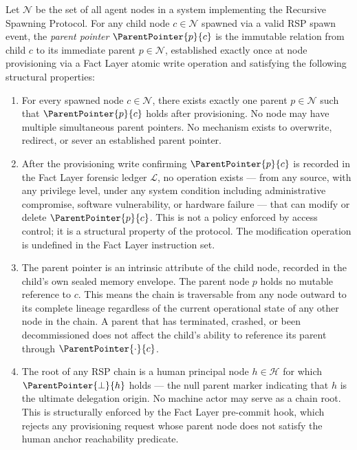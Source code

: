 \begin{dfn}\label{dfn:parent-pointer}
Let $\mathcal{N}$ be the set of all agent nodes in a \bxthree{} system implementing the Recursive Spawning Protocol. For any child node $c \in \mathcal{N}$ spawned via a valid RSP spawn event, the \emph{parent pointer} $\ParentPointer{p}{c}$ is the immutable relation from child $c$ to its immediate parent $p \in \mathcal{N}$, established exactly once at node provisioning via a Fact Layer atomic write operation and satisfying the following structural properties:

\begin{enumerate}
    \item[(P1) \textbf{Uniqueness}] For every spawned node $c \in \mathcal{N}$, there exists exactly one parent $p \in \mathcal{N}$ such that $\ParentPointer{p}{c}$ holds after provisioning. No node may have multiple simultaneous parent pointers. No mechanism exists to overwrite, redirect, or sever an established parent pointer.

    \item[(P2) \textbf{Immutability}] After the provisioning write confirming $\ParentPointer{p}{c}$ is recorded in the Fact Layer forensic ledger $\mathcal{L}$, no operation exists — from any source, with any privilege level, under any system condition including administrative compromise, software vulnerability, or hardware failure — that can modify or delete $\ParentPointer{p}{c}$. This is not a policy enforced by access control; it is a structural property of the protocol. The modification operation is undefined in the Fact Layer instruction set.

    \item[(P3) \textbf{Directionality}] The parent pointer is an intrinsic attribute of the child node, recorded in the child's own sealed memory envelope. The parent node $p$ holds no mutable reference to $c$. This means the chain is traversable from any node outward to its complete lineage regardless of the current operational state of any other node in the chain. A parent that has terminated, crashed, or been decommissioned does not affect the child's ability to reference its parent through $\ParentPointer{\cdot}{c}$.

    \item[(P4) \textbf{Human Anchor Termination}] The root of any RSP chain is a human principal node $h \in \mathcal{H}$ for which $\ParentPointer{\bot}{h}$ holds — the null parent marker indicating that $h$ is the ultimate delegation origin. No machine actor may serve as a chain root. This is structurally enforced by the Fact Layer pre-commit hook, which rejects any provisioning request whose parent node does not satisfy the human anchor reachability predicate.
\end{enumerate}
\end{dfn}

